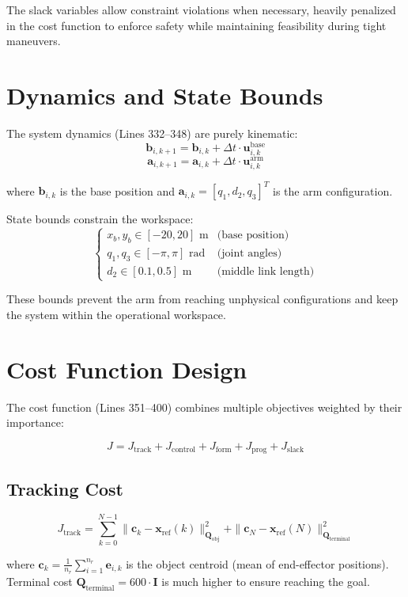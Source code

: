 \documentclass[12pt,a4paper]{article}
\begin{document}
The slack variables allow constraint violations when necessary, heavily penalized in the cost function to enforce safety while maintaining feasibility during tight maneuvers.

\section{Dynamics and State Bounds}

The system dynamics (Lines 332--348) are purely kinematic:
\[
\mathbf{b}_{i,k+1} = \mathbf{b}_{i,k} + \Delta t \cdot \mathbf{u}_{i,k}^{\text{base}}
\]
\[
\mathbf{a}_{i,k+1} = \mathbf{a}_{i,k} + \Delta t \cdot \mathbf{u}_{i,k}^{\text{arm}}
\]

where $\mathbf{b}_{i,k}$ is the base position and $\mathbf{a}_{i,k} = [q_1, d_2, q_3]^T$ is the arm configuration.

State bounds constrain the workspace:
\[
\begin{cases}
x_b, y_b \in [-20, 20] \text{ m} & \text{(base position)} \\
q_1, q_3 \in [-\pi, \pi] \text{ rad} & \text{(joint angles)} \\
d_2 \in [0.1, 0.5] \text{ m} & \text{(middle link length)}
\end{cases}
\]

These bounds prevent the arm from reaching unphysical configurations and keep the system within the operational workspace.

\section{Cost Function Design}

The cost function (Lines 351--400) combines multiple objectives weighted by their importance:

\begin{equation}
J = J_{\text{track}} + J_{\text{control}} + J_{\text{form}} + J_{\text{prog}} + J_{\text{slack}}
\end{equation}

\subsection{Tracking Cost}
\[
J_{\text{track}} = \sum_{k=0}^{N-1} \|\mathbf{c}_k - \mathbf{x}_{\text{ref}}(k)\|_{\mathbf{Q}_{\text{obj}}}^2 + \|\mathbf{c}_N - \mathbf{x}_{\text{ref}}(N)\|_{\mathbf{Q}_{\text{terminal}}}^2
\]

where $\mathbf{c}_k = \frac{1}{n_r}\sum_{i=1}^{n_r} \mathbf{e}_{i,k}$ is the object centroid (mean of end-effector positions). Terminal cost $\mathbf{Q}_{\text{terminal}} = 600 \cdot \mathbf{I}$ is much higher to ensure reaching the goal.
\end{document}
